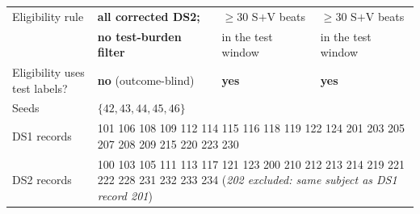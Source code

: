 \begin{table}[H]
\begin{tabular}{llll}
Eligibility rule & \textbf{all corrected DS2;} & $\ge 30$ S$+$V beats & $\ge 30$ S$+$V beats \\
 & \textbf{no test-burden filter} & in the test window & in the test window \\
Eligibility uses test labels? & \textbf{no} (outcome-blind) & \textbf{yes} & \textbf{yes} \\
Seeds & \multicolumn{3}{l}{$\{42,43,44,45,46\}$} \\
\midrule
DS1 records & \multicolumn{3}{p{9.2cm}}{101 106 108 109 112 114 115 116 118 119 122 124 201 203 205 207 208 209 215 220 223 230} \\
DS2 records & \multicolumn{3}{p{9.2cm}}{100 103 105 111 113 117 121 123 200 210 212 213 214 219 221 222 228 231 232 233 234 \quad(\emph{202 excluded: same subject as DS1 record 201})} \\
\bottomrule
\end{tabular}
\end{table}
